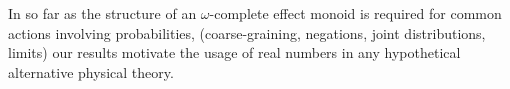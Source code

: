 \documentclass[10pt,conference]{IEEEtran}
\theoremstyle{definition}
\begin{document}
In so far as the structure of an $\omega$-complete effect monoid is
    required for common actions involving probabilities, (coarse-graining, negations, joint distributions, limits)
    our results motivate the usage of real numbers in any hypothetical
    alternative physical theory.





\end{document}

